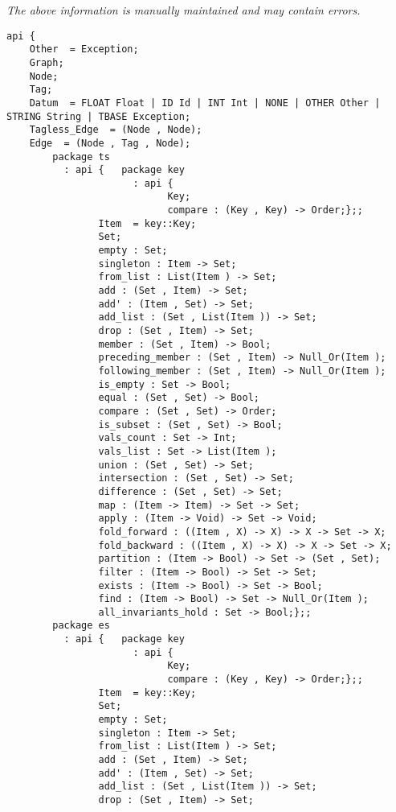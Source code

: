 \label{api:Digraph}

{\tiny \it The above information is manually maintained and may contain errors.}
\begin{verbatim}
api {
    Other  = Exception;
    Graph;
    Node;
    Tag;
    Datum  = FLOAT Float | ID Id | INT Int | NONE | OTHER Other | STRING String | TBASE Exception;
    Tagless_Edge  = (Node , Node);
    Edge  = (Node , Tag , Node);
        package ts
          : api {   package key
                      : api {
                            Key;
                            compare : (Key , Key) -> Order;};;
                Item  = key::Key;
                Set;
                empty : Set;
                singleton : Item -> Set;
                from_list : List(Item ) -> Set;
                add : (Set , Item) -> Set;
                add' : (Item , Set) -> Set;
                add_list : (Set , List(Item )) -> Set;
                drop : (Set , Item) -> Set;
                member : (Set , Item) -> Bool;
                preceding_member : (Set , Item) -> Null_Or(Item );
                following_member : (Set , Item) -> Null_Or(Item );
                is_empty : Set -> Bool;
                equal : (Set , Set) -> Bool;
                compare : (Set , Set) -> Order;
                is_subset : (Set , Set) -> Bool;
                vals_count : Set -> Int;
                vals_list : Set -> List(Item );
                union : (Set , Set) -> Set;
                intersection : (Set , Set) -> Set;
                difference : (Set , Set) -> Set;
                map : (Item -> Item) -> Set -> Set;
                apply : (Item -> Void) -> Set -> Void;
                fold_forward : ((Item , X) -> X) -> X -> Set -> X;
                fold_backward : ((Item , X) -> X) -> X -> Set -> X;
                partition : (Item -> Bool) -> Set -> (Set , Set);
                filter : (Item -> Bool) -> Set -> Set;
                exists : (Item -> Bool) -> Set -> Bool;
                find : (Item -> Bool) -> Set -> Null_Or(Item );
                all_invariants_hold : Set -> Bool;};;
        package es
          : api {   package key
                      : api {
                            Key;
                            compare : (Key , Key) -> Order;};;
                Item  = key::Key;
                Set;
                empty : Set;
                singleton : Item -> Set;
                from_list : List(Item ) -> Set;
                add : (Set , Item) -> Set;
                add' : (Item , Set) -> Set;
                add_list : (Set , List(Item )) -> Set;
                drop : (Set , Item) -> Set;

\end{verbatim}
